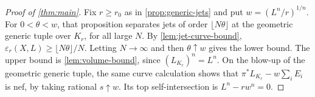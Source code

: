 \begin{proof}[Proof of \cref{thm:main}]
Fix $r\ge r_0$ as in \cref{prop:generic-jets} and put $w=(L^n/r)^{1/n}$. For $0<\theta<w$, that proposition separates jets of order $\lfloor N\theta\rfloor$ at the geometric generic tuple over $K_r$, for all large $N$. By \cref{lem:jet-curve-bound}, $\varepsilon_r(X,L)\ge\lfloor N\theta\rfloor/N$. Letting $N\to\infty$ and then $\theta\uparrow w$ gives the lower bound. The upper bound is \cref{lem:volume-bound}, since $(L_{K_r})^n=L^n$. On the blow-up of the geometric generic tuple, the same curve calculation shows that $\pi^*L_{K_r}-w\sum_i E_i$ is nef, by taking rational $s\uparrow w$. Its top self-intersection is $L^n-rw^n=0$.
\end{proof}

